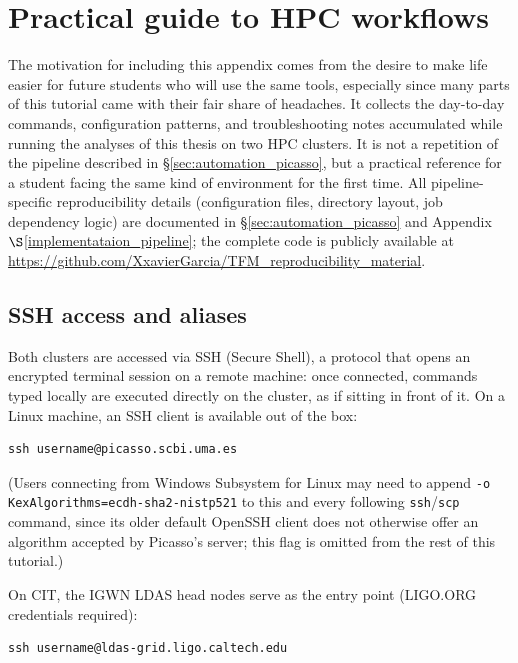 \renewcommand{\thechapter}{B} 
\chapter{Practical guide to HPC workflows}
\label{Reproducibility tutorial}

The motivation for including this appendix comes from the desire to make life easier for future students who will use the same tools, especially since many parts of this tutorial came with their fair share of headaches. It collects the day-to-day commands, configuration patterns, and troubleshooting notes accumulated while running the analyses of this thesis on two HPC clusters. It is not a repetition of the pipeline described in \S\ref{sec:automation_picasso}, but a practical reference for a student facing the same kind of environment for the first time. All pipeline-specific reproducibility details (configuration files, directory layout, job dependency logic) are documented in \S\ref{sec:automation_picasso} and Appendix~$\S$\ref{implementataion_pipeline}; the complete code is publicly available at \url{https://github.com/XxavierGarcia/TFM_reproducibility_material}.

\section{SSH access and aliases}

Both clusters are accessed via SSH (Secure Shell), a protocol that opens an encrypted terminal session on a remote machine: once connected, commands typed locally are executed directly on the cluster, as if sitting in front of it. On a Linux machine, an SSH client is available out of the box:

\begin{verbatim}
ssh username@picasso.scbi.uma.es
\end{verbatim}

(Users connecting from Windows Subsystem for Linux may need to append \texttt{-o KexAlgorithms=\allowbreak ecdh-sha2-nistp521} to this and every following \texttt{ssh}/\texttt{scp} command, since its older default OpenSSH client does not otherwise offer an algorithm accepted by Picasso's server; this flag is omitted from the rest of this tutorial.)

On CIT, the IGWN LDAS head nodes serve as the entry point (LIGO.ORG credentials required):

\begin{verbatim}
ssh username@ldas-grid.ligo.caltech.edu
\end{verbatim}

